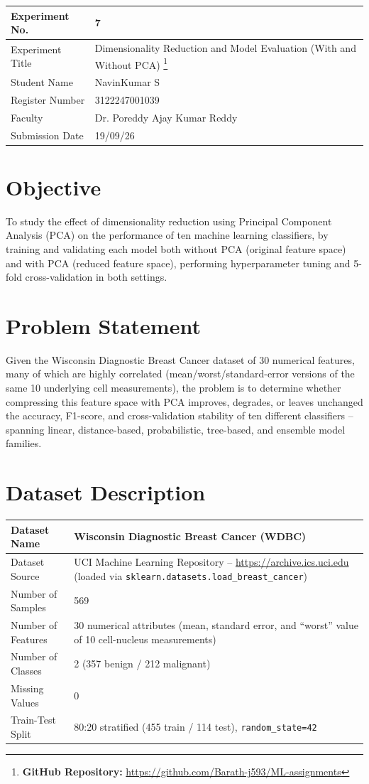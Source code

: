 \documentclass[12pt,a4paper]{article}
\begin{document}
\begin{tabular}{|p{4cm}|p{11cm}|}
\hline
Experiment No. & 7 \\ \hline
Experiment Title & Dimensionality Reduction and Model Evaluation (With and Without PCA)
\footnote{\textbf{GitHub Repository: }\url{https://github.com/Barath-j593/ML-assignments}}\\ \hline
Student Name & NavinKumar S \\ \hline
Register Number & 3122247001039 \\ \hline
Faculty & Dr. Poreddy Ajay Kumar Reddy \\ \hline
Submission Date & 19/09/26 \\ \hline
\end{tabular}

\section{Objective}
To study the effect of dimensionality reduction using Principal Component Analysis (PCA) on
the performance of ten machine learning classifiers, by training and validating each model
both without PCA (original feature space) and with PCA (reduced feature space), performing
hyperparameter tuning and 5-fold cross-validation in both settings.

\section{Problem Statement}
Given the Wisconsin Diagnostic Breast Cancer dataset of 30 numerical features, many of which
are highly correlated (mean/worst/standard-error versions of the same 10 underlying cell
measurements), the problem is to determine whether compressing this feature space with PCA
improves, degrades, or leaves unchanged the accuracy, F1-score, and cross-validation
stability of ten different classifiers -- spanning linear, distance-based, probabilistic,
tree-based, and ensemble model families.

\section{Dataset Description}
\begin{longtable}{|p{6cm}|p{8cm}|}
\hline
Dataset Name & Wisconsin Diagnostic Breast Cancer (WDBC) \\ \hline
Dataset Source & UCI Machine Learning Repository -- \url{https://archive.ics.uci.edu} (loaded via \texttt{sklearn.datasets.load\_breast\_cancer}) \\ \hline
Number of Samples & 569 \\ \hline
Number of Features & 30 numerical attributes (mean, standard error, and ``worst'' value of 10 cell-nucleus measurements) \\ \hline
Number of Classes & 2 (357 benign / 212 malignant) \\ \hline
Missing Values & 0 \\ \hline
Train-Test Split & 80:20 stratified (455 train / 114 test), \texttt{random\_state=42} \\ \hline
\end{longtable}
\end{document}
